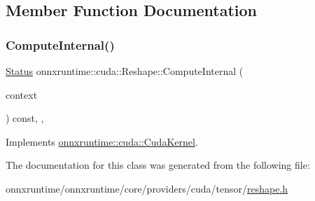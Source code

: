 \subsection{Member Function Documentation}
\mbox{\label{classonnxruntime_1_1cuda_1_1Reshape_a110bf34bdeed233d0e614d168ff438c3}} 
\subsubsection{\texorpdfstring{Compute\+Internal()}{ComputeInternal()}}
{\footnotesize\ttfamily \mbox{\hyperlink{classonnxruntime_1_1common_1_1Status}{Status}} onnxruntime\+::cuda\+::\+Reshape\+::\+Compute\+Internal (\begin{DoxyParamCaption}\item[{\mbox{\hyperlink{classonnxruntime_1_1OpKernelContext}{Op\+Kernel\+Context}} $\ast$}]{context }\end{DoxyParamCaption}) const\hspace{0.3cm}{\ttfamily [inline]}, {\ttfamily [override]}, {\ttfamily [virtual]}}



Implements \mbox{\hyperlink{classonnxruntime_1_1cuda_1_1CudaKernel_aca7af04ae448017d6023d30bba231ebb}{onnxruntime\+::cuda\+::\+Cuda\+Kernel}}.



The documentation for this class was generated from the following file\+:\begin{DoxyCompactItemize}
\item 
onnxruntime/onnxruntime/core/providers/cuda/tensor/\mbox{\hyperlink{cuda_2tensor_2reshape_8h}{reshape.\+h}}\end{DoxyCompactItemize}
